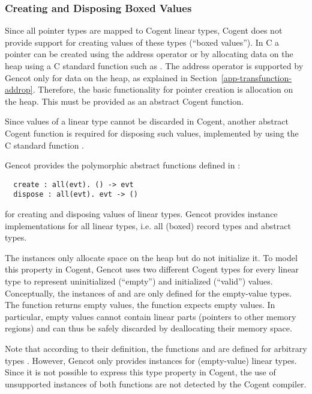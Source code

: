 \subsubsection{Creating and Disposing Boxed Values}

Since all pointer types are mapped to Cogent linear types, Cogent does not provide support for creating values
of these types (``boxed values''). In C a pointer can be created using the address operator \code{\&} or by allocating data on
the heap using a C standard function such as . The address operator is supported by Gencot
only for data on the heap, as explained in Section~\ref{app-transfunction-addrop}. Therefore, the basic functionality
for pointer creation is allocation on the heap. This must be provided as an abstract Cogent function.

Since values of a linear type cannot be discarded in Cogent, another abstract Cogent function is required for
disposing such values, implemented by using the C standard function .

Gencot provides the polymorphic abstract functions defined in :
\begin{verbatim}
  create : all(evt). () -> evt
  dispose : all(evt). evt -> ()
\end{verbatim}
for creating and disposing values of linear types. Gencot provides instance implementations for all linear
types, i.e. all (boxed) record types and abstract types.

The  instances only allocate space on the heap but do not initialize it. To model this property in 
Cogent, Gencot uses two different Cogent types for every linear type to represent uninitialized (``empty'') and 
initialized (``valid'') values.
Conceptually, the instances of  and  are only defined for the empty-value types.
The function  returns empty values, the function  expects empty values. In particular,
empty values cannot contain linear parts (pointers to other memory regions) and can thus be safely discarded by 
deallocating their memory space. 

Note that according to their definition, the functions  and  are defined for arbitrary
types . However, Gencot only provides instances for (empty-value) linear types. Since it is not possible
to express this type property in Cogent, the use of unsupported instances of both functions are not detected by the 
Cogent compiler.

